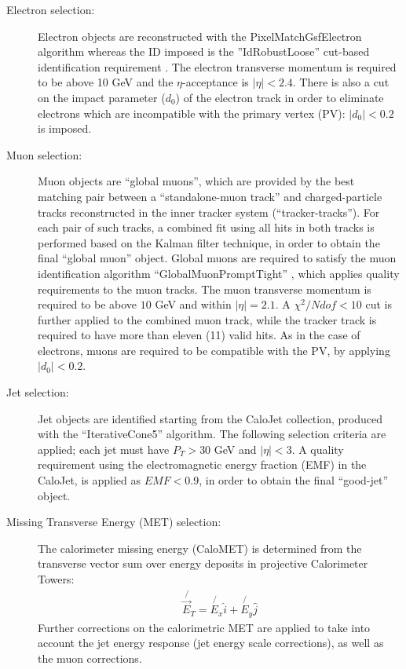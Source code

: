 \begin{description}
\item[Electron selection:] Electron objects are reconstructed with the PixelMatchGsfElectron algorithm whereas the ID imposed is the ''IdRobustLoose'' cut-based identification requirement \cite{elecid}. The electron transverse momentum is required to be above 10 GeV and the $\eta$-acceptance is $|\eta|<2.4$. There is also a cut on the impact parameter ($d_{0}$) of the electron track in order to eliminate electrons which are incompatible with the primary vertex (PV): $|d_{0}| < 0.2$ is imposed.

\item[Muon selection:] Muon objects are ``global muons'', which are provided by the best matching pair between a ``standalone-muon track'' and charged-particle tracks reconstructed in the inner tracker system (``tracker-tracks''). For each pair of such tracks, a combined fit using all hits in both tracks is performed based on the Kalman filter technique, in order to obtain the final ``global muon'' object. Global muons are required to satisfy the muon identification algorithm ``GlobalMuonPromptTight'' \cite{muonid}, which applies quality requirements to the muon tracks.  The muon transverse momentum is required to be above $10$ GeV and within $|\eta|=2.1$. A $\chi^{2}/Ndof < 10$ cut is further applied to the combined muon track, while the tracker track is required to have more than eleven (11) valid hits. As in the case of electrons, muons are required to be compatible with the PV, by applying $|d_{0}| < 0.2$.

\item[Jet selection:] Jet objects are identified starting from the CaloJet collection, produced with the ``IterativeCone5'' algorithm. The following selection criteria are applied; each jet must have $P_{T}>30$ GeV and $|\eta| < 3$. A quality requirement using the electromagnetic energy fraction (EMF) in the CaloJet, is applied as $EMF < 0.9$, in order to obtain the final ``good-jet'' object.

\item[Missing Transverse Energy (MET) selection:] The calorimeter missing energy (CaloMET) is determined from the transverse vector sum over energy deposits in projective Calorimeter Towers:
\begin{eqnarray}
\not{\vec{E}_{T}} = \not{E_{x}} \hat{i} + \not{E_{y}} \hat{j}
\end{eqnarray}
Further corrections on the calorimetric MET are applied to take into account the jet energy response (jet energy scale corrections), as well as the muon corrections.

\end{description}

